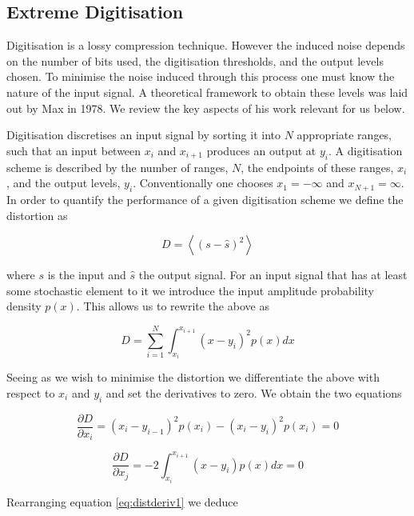\documentclass[apj]{emulateapj}
\begin{document}
\subsection{Extreme Digitisation}
\label{subsec:extremedigitisation}


Digitisation is a lossy compression technique. However the induced noise depends on the number of bits used, the digitisation thresholds, and the output levels chosen. To minimise the noise induced through this process one must know the nature of the input signal. A theoretical framework to obtain these levels was laid out by Max in 1978. We review the key aspects of his work relevant for us below.

Digitisation discretises an input signal by sorting it into $N$ appropriate ranges, such that an input between $x_i$ and $x_{i+1}$ produces an output at $y_i$. A digitisation scheme is described by the number of ranges, $N$, the endpoints of these ranges, $x_i$, and the output levels, $y_i$. Conventionally one chooses $x_{1} = -\infty$ and $x_{N+1} = \infty$. In order to quantify the performance of a given digitisation scheme we define the distortion as

\[ D = \left\langle  \left( s - \hat{s} \right)^2 \right\rangle \]

where $s$ is the input and $\hat{s}$ the output signal. For an input signal that has at least some stochastic element to it we introduce the input amplitude probability density $p(x)$. This allows us to rewrite the above as

\[ D = \sum_{i = 1}^N \int_{x_i}^{x_{i+1}} \left(x-y_i\right)^2 p(x) dx \]

Seeing as we wish to minimise the distortion we differentiate the above with respect to $x_i$ and $y_i$ and set the derivatives to zero. We obtain the two equations

\begin{equation} \label{eq:distderiv1}
\frac{\partial D}{\partial x_i} = \left(x_i-y_{i-1}\right)^2 p(x_i) - \left(x_i - y_i\right)^2 p(x_i) = 0
\end{equation}

\begin{equation} \label{eq:distderiv2}
\frac{\partial D}{\partial x_j} = -2 \int_{x_i}^{x_{i+1}} \left( x-y_i \right) p(x) dx = 0
\end{equation}

Rearranging equation \ref{eq:distderiv1} we deduce
\end{document}
